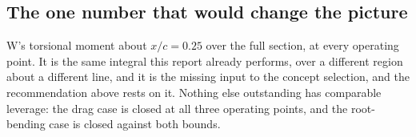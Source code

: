 \subsection{The one number that would change the picture}
\label{sec:concl:next}
W's torsional moment about $x/c = 0.25$ over the full section, at every operating point. It is
the same integral this report already performs, over a different region about a different line, and
it is the missing input to the concept selection, and the recommendation above rests on it. Nothing
else outstanding has comparable leverage: the drag case is closed at all three operating points,
and the root-bending case is closed against both bounds.
